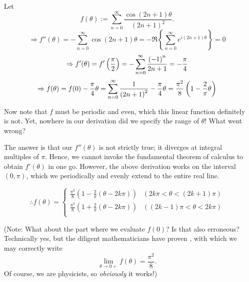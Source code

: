 \item

Let
\[
    f(\theta) := \sum_{n=0}^\infty \frac{\cos (2n+1) \theta}{{(2n+1)}^2}.
\]
\[
    \Rightarrow f''(\theta)
    = -\sum_{n=0}^\infty \cos (2n+1) \theta
    = -\Re\left\{ \sum_{n=0}^\infty e^{i(2n+1)\theta} \right\}
    = 0
\]
\[
    \Rightarrow f'(\theta)
    = f'\left( \frac{\pi}{2} \right)
    = -\sum_{n=0}^\infty \frac{{(-1)}^n}{2n+1}
    = -\frac{\pi}{4}
\]
\[
    \Rightarrow f(\theta)
    = f(0) - \frac{\pi}{4} \theta
    = \sum_{n=0}^\infty \frac{1}{{(2n+1)}^2} - \frac{\pi}{4} \theta
    = \frac{\pi^2}{8} \left( 1 - \frac{2}{\pi}\theta \right)
\]

Now note that $f$ must be periodic and even, which this linear function definitely is not.
Yet, nowhere in our derivation did we specify the range of $\theta$!
What went wrong?

The answer is that our $f''(\theta)$ is not strictly true;
it diverges at integral multiples of $\pi$.
Hence, we cannot invoke the fundamental theorem of calculus to obtain $f'(\theta)$ in one go.
However, the above derivation works on the interval $(0,\pi)$,
which we periodically and evenly extend to the entire real line.

\[
    \therefore f(\theta) = \begin{cases}
        \frac{\pi^2}{8} \left( 1 - \frac{2}{\pi} (\theta - 2k\pi) \right) & (2k\pi < \theta < (2k+1)\pi) \\
        \frac{\pi^2}{8} \left( 1 + \frac{2}{\pi} (\theta - 2k\pi) \right) & ((2k-1)\pi < \theta < 2k\pi) \\
    \end{cases}
\]

(Note: What about the part where we evaluate $f(0)$? Is that also erroneous?
Technically yes, but the diligent mathematicians have proven
,
with which we may correctly write
\[
    \lim_{\theta \rightarrow 0+} f(\theta) = \frac{\pi^2}{8}.
\]
Of course, we are physicists, so \emph{obviously} it works!)